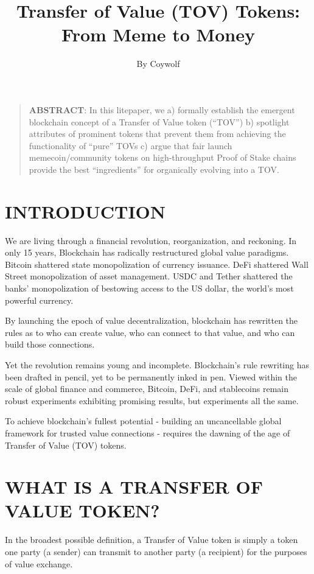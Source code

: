 \documentclass{article}
\title{\textbf{Transfer of Value (TOV) Tokens: From Meme to Money}}
\author{By Coywolf}
\date{}
\begin{document}
\maketitle

\begin{quote}
\textbf{ABSTRACT}: In this litepaper, we a) formally establish the emergent blockchain concept of a Transfer of Value token (``TOV'') b) spotlight attributes of prominent tokens that prevent them from achieving the functionality of ``pure'' TOVs c) argue that fair launch memecoin/community tokens on high-throughput Proof of Stake chains provide the best ``ingredients'' for organically evolving into a TOV.
\end{quote}

\section*{INTRODUCTION}

We are living through a financial revolution, reorganization, and reckoning. In only 15 years, Blockchain has radically restructured global value paradigms. Bitcoin shattered state monopolization of currency issuance. DeFi shattered Wall Street monopolization of asset management. USDC and Tether shattered the banks' monopolization of bestowing access to the US dollar, the world's most powerful currency.

By launching the epoch of value decentralization, blockchain has rewritten the rules as to who can create value, who can connect to that value, and who can build those connections.

Yet the revolution remains young and incomplete. Blockchain's rule rewriting has been drafted in pencil, yet to be permanently inked in pen. Viewed within the scale of global finance and commerce, Bitcoin, DeFi, and stablecoins remain robust experiments exhibiting promising results, but experiments all the same.

To achieve blockchain's fullest potential - building an uncancellable global framework for trusted value connections - requires the dawning of the age of Transfer of Value (TOV) tokens.

\section*{WHAT IS A TRANSFER OF VALUE TOKEN?}

In the broadest possible definition, a Transfer of Value token is simply a token one party (a sender) can transmit to another party (a recipient) for the purposes of value exchange.
\end{document}
